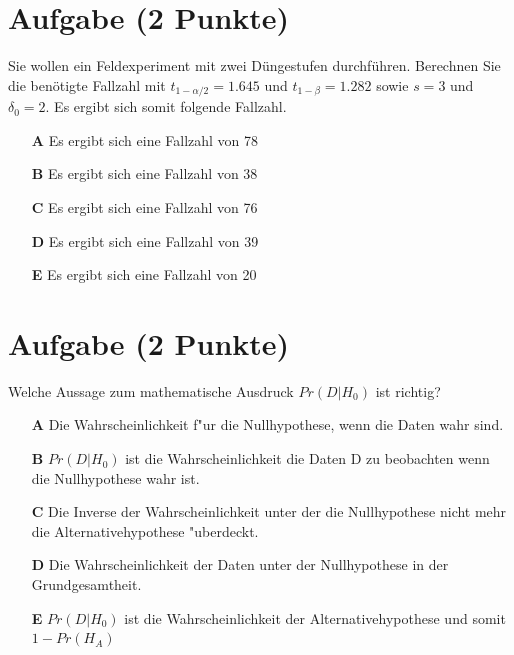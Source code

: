 \documentclass[a4paper, 10pt]{scrartcl}\usepackage[]{graphicx}\usepackage[]{xcolor}
\begin{document}
\section{Aufgabe \hfill (2 Punkte)}




Sie wollen ein Feldexperiment mit zwei D{\"u}ngestufen durchf{\"u}hren. Berechnen
Sie die ben{\"o}tigte Fallzahl mit $t_{1-\alpha/2} = 1.645$ und
$t_{1-\beta} = 1.282$ sowie $s = 3$ und
$\delta_0 = 2$. Es ergibt sich somit folgende Fallzahl.



\begin{enumerate}
\item [\textbf{A} \msquare] Es ergibt sich eine Fallzahl von 78
\item [\textbf{B} \msquare] Es ergibt sich eine Fallzahl von 38
\item [\textbf{C} \msquare] Es ergibt sich eine Fallzahl von 76
\item [\textbf{D} \msquare] Es ergibt sich eine Fallzahl von 39
\item [\textbf{E} \msquare] Es ergibt sich eine Fallzahl von 20
\end{enumerate}

\section{Aufgabe \hfill (2 Punkte)}

Welche Aussage zum mathematische Ausdruck $Pr(D|H_0)$ ist richtig? 



\begin{enumerate}
\item [\textbf{A} \msquare] Die Wahrscheinlichkeit f{"u}r die Nullhypothese, wenn die Daten wahr sind.
\item [\textbf{B} \msquare] $Pr(D|H_0)$ ist die Wahrscheinlichkeit die Daten D zu beobachten wenn die Nullhypothese wahr ist.
\item [\textbf{C} \msquare] Die Inverse der Wahrscheinlichkeit unter der die Nullhypothese nicht mehr die Alternativehypothese {"u}berdeckt.
\item [\textbf{D} \msquare] Die Wahrscheinlichkeit der Daten unter der Nullhypothese in der Grundgesamtheit.
\item [\textbf{E} \msquare] $Pr(D|H_0)$ ist die Wahrscheinlichkeit der Alternativehypothese und somit $1 - Pr(H_A)$
\end{enumerate}
\end{document}
